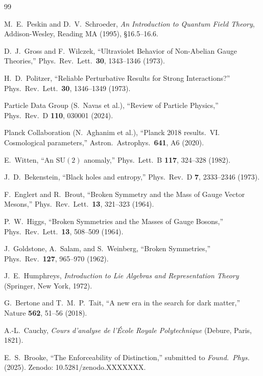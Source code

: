 \documentclass[11pt]{article}
\begin{document}
\begin{thebibliography}{99}

 M.~E.~Peskin and D.~V.~Schroeder, \emph{An Introduction to Quantum Field Theory}, Addison-Wesley, Reading MA (1995), \S16.5--16.6.

 D.~J.~Gross and F.~Wilczek, ``Ultraviolet Behavior of Non-Abelian Gauge Theories,'' Phys.\ Rev.\ Lett.\ \textbf{30}, 1343--1346 (1973).

 H.~D.~Politzer, ``Reliable Perturbative Results for Strong Interactions?'' Phys.\ Rev.\ Lett.\ \textbf{30}, 1346--1349 (1973).

 Particle Data Group (S.~Navas et al.), ``Review of Particle Physics,'' Phys.\ Rev.\ D \textbf{110}, 030001 (2024).

 Planck Collaboration (N.~Aghanim et al.), ``Planck 2018 results.\ VI\@. Cosmological parameters,'' Astron.\ Astrophys.\ \textbf{641}, A6 (2020).

 E.~Witten, ``An $\mathrm{SU}(2)$ anomaly,'' Phys.\ Lett.\ B \textbf{117}, 324--328 (1982).

 J.~D.~Bekenstein, ``Black holes and entropy,'' Phys.\ Rev.\ D \textbf{7}, 2333--2346 (1973).

 F.~Englert and R.~Brout, ``Broken Symmetry and the Mass of Gauge Vector Mesons,'' Phys.\ Rev.\ Lett.\ \textbf{13}, 321--323 (1964).

 P.~W.~Higgs, ``Broken Symmetries and the Masses of Gauge Bosons,'' Phys.\ Rev.\ Lett.\ \textbf{13}, 508--509 (1964).

 J.~Goldstone, A.~Salam, and S.~Weinberg, ``Broken Symmetries,'' Phys.\ Rev.\ \textbf{127}, 965--970 (1962).

 J.~E.~Humphreys, \emph{Introduction to Lie Algebras and Representation Theory} (Springer, New York, 1972).

 G.~Bertone and T.~M.~P.~Tait, ``A new era in the search for dark matter,'' Nature \textbf{562}, 51--56 (2018).

 A.-L.~Cauchy, \emph{Cours d'analyse de l'\'{E}cole Royale Polytechnique} (Debure, Paris, 1821).

 E.~S.~Brooke, ``The Enforceability of Distinction,'' submitted to \emph{Found.\ Phys.} (2025).  Zenodo: 10.5281/zenodo.XXXXXXX.


\end{thebibliography}
\end{document}
